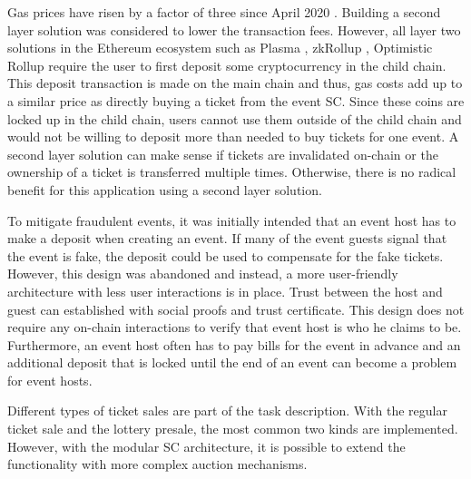 Gas prices have risen by a factor of three since April 2020 \cite{ethereum-gas-price-chart}. Building a second layer solution was considered to lower the transaction fees. However, all layer two solutions in the Ethereum ecosystem such as Plasma \cite{plasma}, zkRollup \cite{zkrollup}, Optimistic Rollup \cite{optimistic-rollup} require the user to first deposit some cryptocurrency in the child chain. This deposit transaction is made on the main chain and thus, gas costs add up to a similar price as directly buying a ticket from the event SC. Since these coins are locked up in the child chain, users cannot use them outside of the child chain and would not be willing to deposit more than needed to buy tickets for one event. A second layer solution can make sense if tickets are invalidated on-chain or the ownership of a ticket is transferred multiple times. Otherwise, there is no radical benefit for this application using a second layer solution. 

To mitigate fraudulent events, it was initially intended that an event host has to make a deposit when creating an event. If many of the event guests signal that the event is fake, the deposit could be used to compensate for the fake tickets. However, this design was abandoned and instead, a more user-friendly architecture with less user interactions is in place. Trust between the host and guest can established with social proofs and trust certificate. This design does not require any on-chain interactions to verify that event host is who he claims to be. Furthermore, an event host often has to pay bills for the event in advance and an additional deposit that is locked until the end of an event can become a problem for event hosts. 

Different types of ticket sales are part of the task description. With the regular ticket sale and the lottery presale, the most common two kinds are implemented. However, with the modular SC architecture, it is possible to extend the functionality with more complex auction mechanisms.

